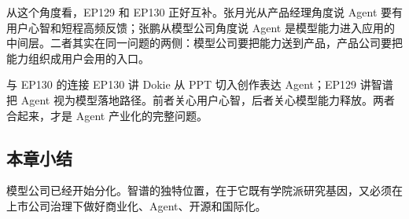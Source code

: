 从这个角度看，EP129 和 EP130 正好互补。张月光从产品经理角度说 Agent 要有用户心智和短程高频反馈；张鹏从模型公司角度说 Agent 是模型能力进入应用的中间层。二者其实在同一问题的两侧：模型公司要把能力送到产品，产品公司要把能力组织成用户会用的入口。

\begin{knowledgebox}{与 EP130 的连接}
EP130 讲 Dokie 从 PPT 切入创作表达 Agent；EP129 讲智谱把 Agent 视为模型落地路径。前者关心用户心智，后者关心模型能力释放。两者合起来，才是 Agent 产业化的完整问题。
\end{knowledgebox}

\subsection{本章小结}

模型公司已经开始分化。智谱的独特位置，在于它既有学院派研究基因，又必须在上市公司治理下做好商业化、Agent、开源和国际化。

